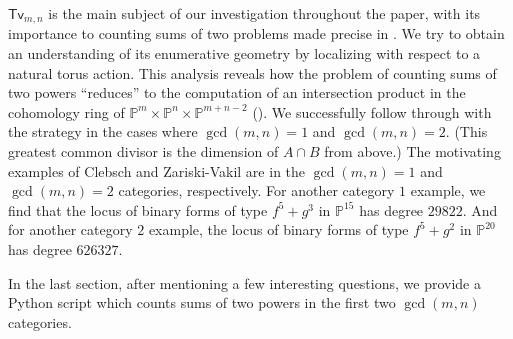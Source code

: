 \documentclass[reqno, 11pt]{amsart}
\theoremstyle{plain}
\newtheorem{theorem}{Theorem}[section]
\theoremstyle{remark}
\renewcommand{\P}{\mathbb{P}}
\DeclareMathOperator{\lcm}{lcm}
\DeclareMathOperator{\Clebsch}{\mathsf{CZV}}
\newcommand{\transvectant}{\mathsf{Tv}}
\begin{document}
$\transvectant_{m,n}$ is the main subject of our investigation throughout the paper, with its importance to counting sums of two problems made precise in .  We try to obtain an understanding of its enumerative geometry by localizing with respect to a natural torus action.  This analysis reveals how the problem of counting sums of two powers ``reduces'' to the computation of an intersection product in the cohomology ring of $\P^{m} \times \P^{n} \times \P^{m+n-2}$ ().  We successfully follow through with the strategy in the cases where $\gcd(m,n) = 1$ and $\gcd(m,n) = 2$.  (This greatest common divisor is the dimension of $A \cap B$ from above.)  The motivating examples of Clebsch and Zariski-Vakil are in the $\gcd(m,n) = 1$ and $\gcd(m,n) = 2$ categories, respectively.  For another category $1$ example, we find that the locus of binary forms of type $f^{5} + g^{3}$ in $\P^{15}$ has degree $29822$.  And for another category $2$ example, the locus of binary forms of type $f^{5} + g^{2}$ in $\P^{20}$ has degree $626327$. 

In the last section, after mentioning a few interesting questions, we provide a Python script which counts sums of two powers in the first two $\gcd(m,n)$ categories. 








    
\end{document}
